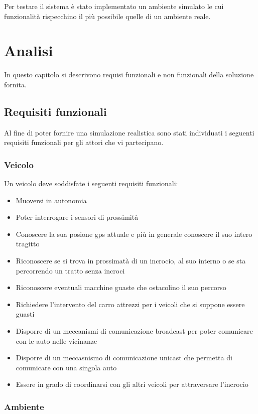 \documentclass{memoir}
\begin{document}
Per testare il sistema è stato implementato un ambiente simulato le cui
funzionalità rispecchino il più possibile quelle di un ambiente reale.

\chapter{Analisi}\label{ch:analysis}
In questo capitolo si descrivono requisi funzionali e non funzionali della
soluzione fornita.

\section{Requisiti funzionali}

Al fine di poter fornire una simulazione realistica sono stati individuati i
seguenti requisiti funzionali per gli attori che vi partecipano.

\subsection{Veicolo}

Un veicolo deve soddisfate i seguenti requisiti funzionali:
\begin{itemize}
\item Muoversi in autonomia
\item Poter interrogare i sensori di prossimità
\item Conoscere la sua posione gps attuale e più in generale conoscere il suo
  intero tragitto
\item Riconoscere se si trova in prossimatà di un incrocio, al suo interno o se
  sta percorrendo un tratto senza incroci
\item Riconoscere eventuali macchine guaste che ostacolino il suo percorso
\item Richiedere l'intervento del carro attrezzi per i veicoli che si suppone
  essere guasti
\item Disporre di un meccanismi di comunicazione broadcast per poter comunicare
  con le auto nelle vicinanze
\item Disporre di un meccasnismo di comunicazione unicast che permetta di
  comunicare con una singola auto
\item Essere in grado di coordinarsi con gli altri veicoli per attraversare
  l'incrocio
\end{itemize}

\subsection{Ambiente}
\end{document}
